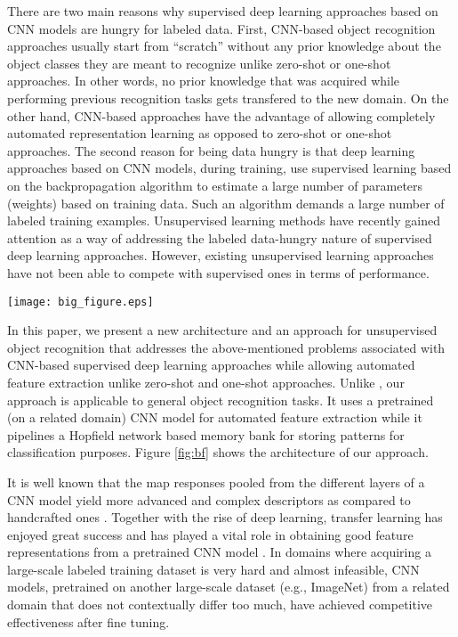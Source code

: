 \documentclass[conference]{IEEEtran}
\begin{document}
 There are two main reasons  why supervised deep learning approaches based on CNN models are hungry for labeled data. First, CNN-based object recognition approaches usually start from ``scratch'' without any prior knowledge about the object classes they are meant to recognize unlike zero-shot or one-shot approaches. In other words, no prior knowledge that was acquired while performing previous recognition tasks gets transfered to the new domain. On the other hand, CNN-based approaches  have the advantage of allowing  completely automated representation learning  as opposed to zero-shot or one-shot approaches.  The second reason for being data hungry is that deep learning approaches based on CNN models, during training,  use supervised learning based on the  backpropagation algorithm to estimate a large number of parameters (weights) based on training data. Such an algorithm demands a large number of  labeled training examples.  Unsupervised learning methods \cite{sabour2017dynamic,Unsupervised} have recently gained attention as a way of addressing the  labeled data-hungry nature of supervised deep learning approaches. However, existing unsupervised learning approaches have not been able to compete with supervised ones in terms of performance.  
 
\begin{figure*}[t!]
\centering
\texttt{[image: big\_figure.eps]}
\caption{Overview of Pipeline Framework Architecture.}
\label{fig:bf}
\end{figure*} 
 
 In this paper, we present a new architecture and an approach for  unsupervised object recognition that addresses the above-mentioned problems associated with CNN-based supervised deep learning approaches while allowing automated feature extraction unlike zero-shot and one-shot approaches. Unlike \cite{Vicarious}, our approach is applicable to general object recognition tasks. It  uses a pretrained (on a related domain)  CNN model for automated feature extraction while it pipelines a Hopfield network \cite{sabahi2017hopfield} based memory bank for storing patterns for classification purposes. Figure \ref{fig:bf} shows the architecture of our approach. 

 
It is well known  that the map responses  pooled from the  different layers  of a CNN model yield  more  advanced and complex descriptors  as compared to  handcrafted ones \cite{ren2015faster}. Together with the rise of deep learning, transfer learning \cite{pan2010} has enjoyed  great success and  has played a vital role in obtaining  good feature representations from a pretrained CNN model \cite{yosinski2014transferable}. In domains  where acquiring a  large-scale  labeled training dataset is very hard and almost infeasible,  CNN models, pretrained on another large-scale dataset (e.g., ImageNet\cite{deng2009imagenet}) from a  related domain that does not contextually differ too much,  have achieved competitive effectiveness  after fine tuning. 
\end{document}
